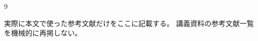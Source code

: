 {}

\begin{thebibliography}{9}

実際に本文で使った参考文献だけをここに記載する。
講義資料の参考文献一覧を機械的に再掲しない。

\end{thebibliography}
